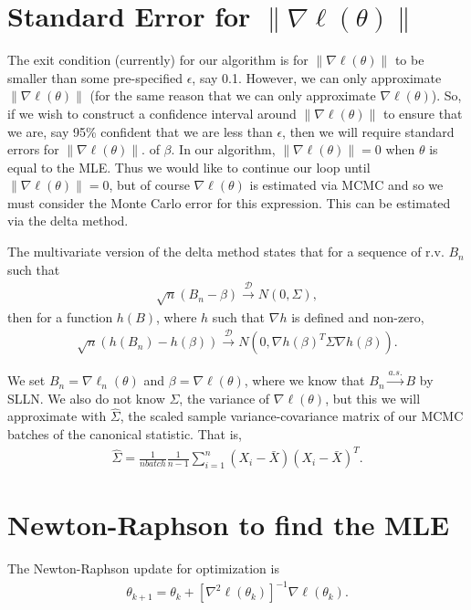 \documentclass{amsbook}
\def\DD{{\mathcal D}}
\theoremstyle{definition}
\theoremstyle{remark}
\begin{document}
\section{Standard Error for $\| \nabla \ell (\theta) \|$}
The exit condition (currently) for our algorithm is for $\| \nabla \ell (\theta) \|$ 
to be smaller than some pre-specified $\epsilon$, say 0.1.  However, we can only 
approximate $\| \nabla \ell (\theta) \|$ (for the same reason that we can only 
approximate $\nabla \ell (\theta)$).  So, if we wish to construct a confidence 
interval around $\| \nabla \ell (\theta) \|$ to ensure that we are, say 95\% 
confident that we are less than $\epsilon$, then we will require standard errors for 
$\| \nabla \ell (\theta) \|$.
of $\beta$.  In our algorithm, $\| \nabla \ell (\theta) \| = 0$ when $\theta$ is 
equal to the MLE.  Thus we would like to continue our loop until $\| \nabla \ell 
(\theta) \| = 0$, but of course $\nabla \ell (\theta)$ is estimated via MCMC and so 
we must consider the Monte Carlo error for this expression.  
This can be estimated via the delta method.

The multivariate version of the delta method states that for a sequence of r.v. $B_n$ 
such that
\begin{align*}
	\sqrt{n} ( B_n - \beta) \stackrel{\DD}{\longrightarrow} N( 0, \Sigma ),
\end{align*}
then for a function $h(B)$, where $h$ such that $\nabla h$ is defined and non-zero,
\begin{align*}
	\sqrt{n} \left ( h(B_n) - h(\beta) \right ) \stackrel{\DD}{\longrightarrow} N 
\left ( 0, \nabla h( \beta)^T \Sigma\nabla h( \beta)  \right ).
\end{align*}

We set $B_n = \nabla \ell_n( \theta)$ and $\beta =\nabla \ell( \theta)$, where we 
know that $B_n \stackrel{a.s.}{\longrightarrow} B$ by SLLN.  We also do not know $
\Sigma$, the variance of $\nabla \ell( \theta)$, but this we will approximate with $
\hat{\Sigma}$, the scaled sample variance-covariance matrix of our MCMC batches of 
the canonical statistic.  That is,
\begin{align*}
	\hat{\Sigma} = \frac{1}{nbatch}\frac{1}{n-1}\sum_{i=1}^{n} (X_i - \bar{X})( X_i - 
\bar{X})^T.
\end{align*}


\section{Newton-Raphson to find the MLE}
The Newton-Raphson update for optimization is
\begin{align*}
	\theta_{k+1} = \theta_k + \left [  \nabla^2 \ell (\theta_k) \right ]^{-1} \nabla 
\ell (\theta_k).
\end{align*}
\end{document}
